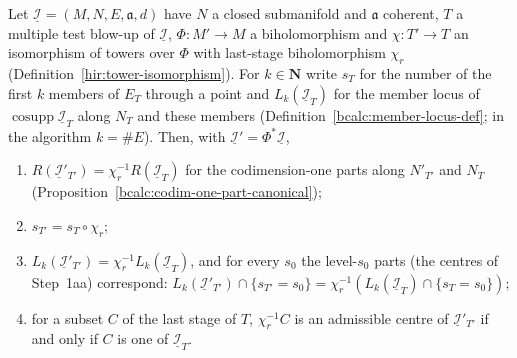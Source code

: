 \begin{proposition}
\label{bcalc:locus-tower-isomorphism}
\upstreamleanok
Let \(\underline{\mathcal I}=(M,N,E,\mathfrak a,d)\) have \(N\) a closed submanifold and \(\mathfrak a\) coherent, \(T\) a multiple test blow-up of \(\underline{\mathcal I}\), \(\Phi\colon M'\to M\) a
biholomorphism and \(\chi\colon T'\to T\) an isomorphism of towers over \(\Phi\) with last-stage biholomorphism \(\chi_r\) (Definition~\ref{hir:tower-isomorphism}). For
\(k\in\mathbf N\) write \(s_T\) for the number of the first \(k\) members of \(E_T\) through a point and \(L_k(\underline{\mathcal I}_T)\) for the member locus of
\(\operatorname{cosupp}\underline{\mathcal I}_T\) along \(N_T\) and these members (Definition~\ref{bcalc:member-locus-def}; in the algorithm \(k=\#E\)). Then, with
\(\underline{\mathcal I}'=\Phi^*\underline{\mathcal I}\),
\begin{enumerate}
\item \(R(\underline{\mathcal I}'_{T'})=\chi_r^{-1}R(\underline{\mathcal I}_T)\) for the codimension-one parts along \(N'_{T'}\) and \(N_T\) (Proposition~\ref{bcalc:codim-one-part-canonical});
\item \(s_{T'}=s_T\circ\chi_r\);
\item \(L_k(\underline{\mathcal I}'_{T'})=\chi_r^{-1}L_k(\underline{\mathcal I}_T)\), and for every \(s_0\) the level-\(s_0\) parts (the centres of Step~1aa) correspond:
\(L_k(\underline{\mathcal I}'_{T'})\cap\{s_{T'}=s_0\}=\chi_r^{-1}(L_k(\underline{\mathcal I}_T)\cap\{s_T=s_0\})\);
\item for a subset \(C\) of the last stage of \(T\), \(\chi_r^{-1}C\) is an admissible centre of \(\underline{\mathcal I}'_{T'}\) if and only if \(C\) is one of \(\underline{\mathcal I}_T\).

\end{enumerate}
\end{proposition}
